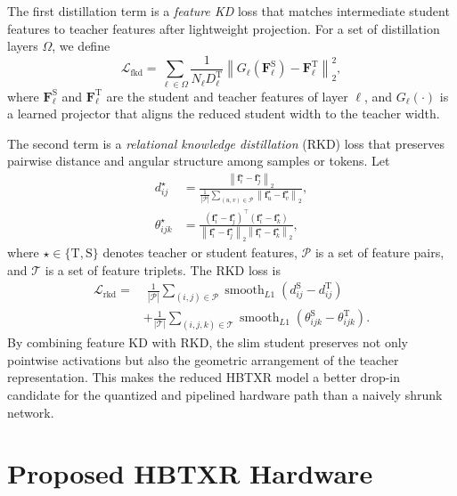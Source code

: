 \documentclass[journal]{IEEEtran}
\begin{document}
The first distillation term is a \emph{feature KD} loss that matches intermediate student features to teacher features after lightweight projection. For a set of distillation layers $\Omega$, we define
\begin{equation}
\mathcal L_{\mathrm{fkd}}=
\sum_{\ell\in\Omega}
\frac{1}{N_{\ell}D_{\ell}^{\mathrm{T}}}
\left\|
G_{\ell}\!\left(\mathbf F_{\ell}^{\mathrm{S}}\right)
-\mathbf F_{\ell}^{\mathrm{T}}
\right\|_2^2,
\end{equation}
where $\mathbf F_{\ell}^{\mathrm{S}}$ and $\mathbf F_{\ell}^{\mathrm{T}}$ are the student and teacher features of layer $\ell$, and $G_{\ell}(\cdot)$ is a learned projector that aligns the reduced student width to the teacher width.

The second term is a \emph{relational knowledge distillation} (RKD) loss that preserves pairwise distance and angular structure among samples or tokens. Let
\begin{align}
d_{ij}^{\star} &=
\frac{\left\|\mathbf f_i^{\star}-\mathbf f_j^{\star}\right\|_2}
{\frac{1}{|\mathcal P|}\sum_{(u,v)\in\mathcal P}\left\|\mathbf f_u^{\star}-\mathbf f_v^{\star}\right\|_2},\\
\theta_{ijk}^{\star} &=
\frac{\left(\mathbf f_i^{\star}-\mathbf f_j^{\star}\right)^{\top}
\left(\mathbf f_i^{\star}-\mathbf f_k^{\star}\right)}
{\left\|\mathbf f_i^{\star}-\mathbf f_j^{\star}\right\|_2
 \left\|\mathbf f_i^{\star}-\mathbf f_k^{\star}\right\|_2},
\end{align}
where $\star\in\{\mathrm{T},\mathrm{S}\}$ denotes teacher or student features, $\mathcal P$ is a set of feature pairs, and $\mathcal T$ is a set of feature triplets. The RKD loss is
\begin{align}
\mathcal L_{\mathrm{rkd}}=
&\;\frac{1}{|\mathcal P|}
\sum_{(i,j)\in\mathcal P}
\operatorname{smooth}_{L1}\!\left(d_{ij}^{\mathrm{S}}-d_{ij}^{\mathrm{T}}\right)
\nonumber\\
&+
\frac{1}{|\mathcal T|}
\sum_{(i,j,k)\in\mathcal T}
\operatorname{smooth}_{L1}\!\left(\theta_{ijk}^{\mathrm{S}}-\theta_{ijk}^{\mathrm{T}}\right).
\end{align}
By combining feature KD with RKD, the slim student preserves not only pointwise activations but also the geometric arrangement of the teacher representation. This makes the reduced HBTXR model a better drop-in candidate for the quantized and pipelined hardware path than a naively shrunk network.

\section{Proposed HBTXR Hardware}
\end{document}
